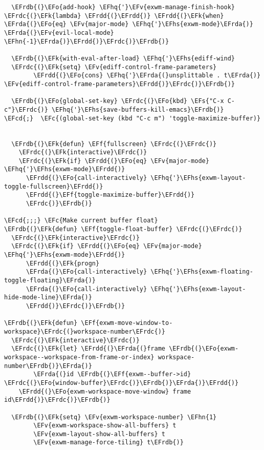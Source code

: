 \documentclass[a4wide,10pt]{article}
\newcommand{\EFc}[1]{\textcolor{EFc}{#1}} %
\newcommand{\EFcd}[1]{\textcolor{EFcd}{#1}} %
\newcommand{\EFs}[1]{\textcolor{EFs}{#1}} %
\newcommand{\EFk}[1]{\textcolor{EFk}{#1}} %
\newcommand{\EFf}[1]{\textcolor{EFf}{#1}} %
\newcommand{\EFv}[1]{\textcolor{EFv}{#1}} %
\newcommand{\EFo}[1]{\textcolor{EFo}{#1}} %
\newcommand{\EFhn}[1]{\textcolor{EFhn}{\textbf{#1}}} %
\newcommand{\EFhq}[1]{\textcolor{EFhq}{#1}} %
\newcommand{\EFhs}[1]{\textcolor{EFhs}{#1}} %
\newcommand{\EFrda}[1]{\textcolor{EFrda}{#1}} %
\newcommand{\EFrdb}[1]{\textcolor{EFrdb}{#1}} %
\newcommand{\EFrdc}[1]{\textcolor{EFrdc}{#1}} %
\newcommand{\EFrdd}[1]{\textcolor{EFrdd}{#1}} %
\begin{document}
\begin{Code}
\begin{Verbatim}
  \EFrdb{(}\EFo{add-hook} \EFhq{'}\EFv{exwm-manage-finish-hook} \EFrdc{(}\EFk{lambda} \EFrdd{(}\EFrdd{)} \EFrdd{(}\EFk{when} \EFrda{(}\EFo{eq} \EFv{major-mode} \EFhq{'}\EFhs{exwm-mode}\EFrda{)} \EFrda{(}\EFv{evil-local-mode} \EFhn{-1}\EFrda{)}\EFrdd{)}\EFrdc{)}\EFrdb{)}

  \EFrdb{(}\EFk{with-eval-after-load} \EFhq{'}\EFhs{ediff-wind}
  \EFrdc{(}\EFk{setq} \EFv{ediff-control-frame-parameters}
        \EFrdd{(}\EFo{cons} \EFhq{'}\EFrda{(}unsplittable . t\EFrda{)} \EFv{ediff-control-frame-parameters}\EFrdd{)}\EFrdc{)}\EFrdb{)}

  \EFrdb{(}\EFo{global-set-key} \EFrdc{(}\EFo{kbd} \EFs{"C-x C-c"}\EFrdc{)} \EFhq{'}\EFhs{save-buffers-kill-emacs}\EFrdb{)}
\EFcd{;}  \EFc{(global-set-key (kbd "C-c m") 'toggle-maximize-buffer)}


  \EFrdb{(}\EFk{defun} \EFf{fullscreen} \EFrdc{(}\EFrdc{)}
    \EFrdc{(}\EFk{interactive}\EFrdc{)}
    \EFrdc{(}\EFk{if} \EFrdd{(}\EFo{eq} \EFv{major-mode} \EFhq{'}\EFhs{exwm-mode}\EFrdd{)}
      \EFrdd{(}\EFo{call-interactively} \EFhq{'}\EFhs{exwm-layout-toggle-fullscreen}\EFrdd{)}
      \EFrdd{(}\EFf{toggle-maximize-buffer}\EFrdd{)}
      \EFrdc{)}\EFrdb{)}

\EFcd{;;;} \EFc{Make current buffer float}
\EFrdb{(}\EFk{defun} \EFf{toggle-float-buffer} \EFrdc{(}\EFrdc{)}
  \EFrdc{(}\EFk{interactive}\EFrdc{)}
  \EFrdc{(}\EFk{if} \EFrdd{(}\EFo{eq} \EFv{major-mode} \EFhq{'}\EFhs{exwm-mode}\EFrdd{)}
      \EFrdd{(}\EFk{progn}
      \EFrda{(}\EFo{call-interactively} \EFhq{'}\EFhs{exwm-floating-toggle-floating}\EFrda{)}
      \EFrda{(}\EFo{call-interactively} \EFhq{'}\EFhs{exwm-layout-hide-mode-line}\EFrda{)}
      \EFrdd{)}\EFrdc{)}\EFrdb{)}

\EFrdb{(}\EFk{defun} \EFf{exwm-move-window-to-workspace}\EFrdc{(}workspace-number\EFrdc{)}
  \EFrdc{(}\EFk{interactive}\EFrdc{)}
  \EFrdc{(}\EFk{let} \EFrdd{(}\EFrda{(}frame \EFrdb{(}\EFo{exwm-workspace--workspace-from-frame-or-index} workspace-number\EFrdb{)}\EFrda{)}
        \EFrda{(}id \EFrdb{(}\EFf{exwm--buffer->id} \EFrdc{(}\EFo{window-buffer}\EFrdc{)}\EFrdb{)}\EFrda{)}\EFrdd{)}
    \EFrdd{(}\EFo{exwm-workspace-move-window} frame id\EFrdd{)}\EFrdc{)}\EFrdb{)}

  \EFrdb{(}\EFk{setq} \EFv{exwm-workspace-number} \EFhn{1}
        \EFv{exwm-workspace-show-all-buffers} t
        \EFv{exwm-layout-show-all-buffers} t
        \EFv{exwm-manage-force-tiling} t\EFrdb{)}


\end{Verbatim}
\end{Code}
\end{document}
